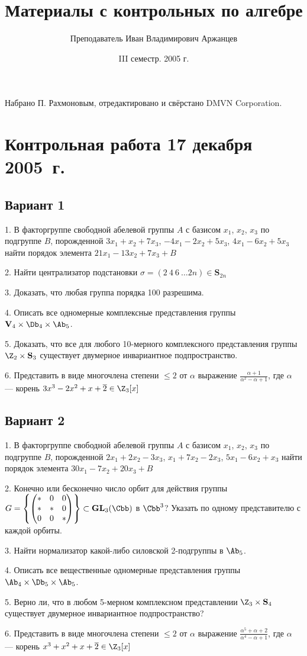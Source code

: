 \documentclass[a4paper]{article}
\title{Материалы с контрольных по алгебре}
\author{Преподаватель Иван Владимирович Аржанцев}
\date{III семестр. 2005 г.}
\begin{document}
\maketitle
\centerline{\small Набрано П. Рахмоновым, отредактировано и свёрстано DMVN Corporation.}

\medskip
\dmvntrail

\section{Контрольная работа 17 декабря 2005~г.}

\subsection{Вариант 1}

1. В факторгруппе свободной абелевой группы $A$ с базисом $x_1$,
$x_2$, $x_3$ по подгруппе $B$, порожденной $3x_1+x_2+7x_3$,
$-4x_1-2x_2+5x_3$, $4x_1-6x_2+5x_3$ найти порядок элемента
$21x_1-13x_2+7x_3+B$

2. Найти централизатор подстановки $\sigma =(2\ 4\ 6\ \ldots
2n)\in \mathbf{S}_{2n}$

3. Доказать, что любая группа порядка 100 разрешима.

4. Описать все одномерные комплексные представления группы
$\mathbf{V}_4\times \Db_4\times \Ab_5$.

5. Доказать, что все для любого 10-мерного комплексного
представления группы $\Z_2\times \mathbf{S}_3$ существует
двумерное инвариантное подпространство.

6. Представить в виде многочлена степени $\leq 2$ от $\alpha $
выражение $\frac{\alpha +1}{\alpha^2 -\alpha +1}$, где $\alpha$
--- корень $3x^3-2x^2+x+\overline{2}\in \Z_3[x]$


\subsection{Вариант 2}

1. В факторгруппе свободной абелевой группы $A$ с базисом $x_1$,
$x_2$, $x_3$ по подгруппе $B$, порожденной $2x_1+2x_2-3x_3$,
$x_1+7x_2-2x_3$, $5x_1-6x_2+x_3$ найти порядок элемента
$30x_1-7x_2+20x_3+B$

2. Конечно или бесконечно число орбит для действия группы
$
G=\left\{
\begin{pmatrix}
* & 0 & 0 \\
* & * & 0 \\
0 & 0 & *
\end{pmatrix}
\right\} \subset \mathbf{GL}_3(\Cbb ) $ в $\Cbb^3$? Указать по
одному представителю с каждой орбиты.

3. Найти нормализатор какой-либо силовской 2-подгруппы в
$\Ab_5$.

4. Описать все вещественные одномерные представления группы
$\Ab_4\times \Db_5\times \Ab_5$.

5. Верно ли, что в любом 5-мерном комплексном представлении
$\Z_3\times \mathbf{S}_4$ существует двумерное
инвариантное подпространство?

6. Представить в виде многочлена степени $\leq 2$ от $\alpha $
выражение $\frac{\alpha^5 + \alpha +2}{\alpha^4 -\alpha +1}$, где
$\alpha$ --- корень $x^3+x^2+x+\overline{2}\in \Z_3[x]$
\end{document}
